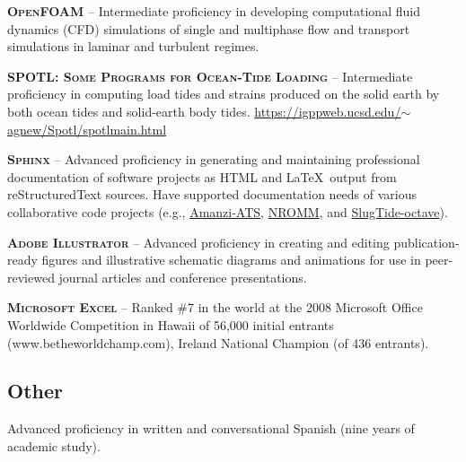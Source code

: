 \documentclass[11pt, letterpaper]{article}
\begin{document}
\textbf{\textsc{OpenFOAM}} -- Intermediate proficiency in developing
computational fluid dynamics (CFD) simulations of single and multiphase flow
and transport simulations in laminar and turbulent regimes.

\textbf{\textsc{SPOTL: Some Programs for Ocean-Tide Loading}} -- Intermediate
proficiency in computing load tides and strains produced on the solid earth by
both ocean tides and solid-earth body tides.
\href{https://igppweb.ucsd.edu/~agnew/Spotl/spotlmain.html}{https://igppweb.ucsd.edu/\(\sim \)agnew/Spotl/spotlmain.html}

\textbf{\textsc{Sphinx}} -- Advanced proficiency in generating and maintaining
professional documentation of software projects as HTML and \LaTeX \ output
from reStructuredText sources. Have supported documentation needs of various
collaborative code projects %
(e.g., \href{https://github.com/amanzi/amanzi}{Amanzi-ATS},
\href{https://gitlab.lanl.gov/jportiz/nromm_user_guide}{NROMM}, and
\href{https://github.com/johnportiz14/SlugTide-octave}{SlugTide-octave}).

\textbf{\textsc{Adobe Illustrator}} -- Advanced proficiency in creating and editing
publication-ready figures and illustrative schematic diagrams and animations for use in peer-reviewed journal articles and conference presentations.

\textbf{\textsc{Microsoft Excel}} -- Ranked \#7 in the world at the 2008 Microsoft Office
Worldwide Competition in Hawaii of 56,000 initial entrants
(www.betheworldchamp.com), Ireland National Champion (of 436 entrants).

% 
% 


\subsection*{Other}
\noindent
Advanced proficiency in written and conversational Spanish (nine years of
academic study).
\end{document}
